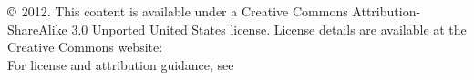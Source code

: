 \chapter*{}
\vfill


\noindent $\copyright$ 2012. This content is available under a Creative Commons Attribution-ShareAlike 3.0 Unported United States license. License details are available at the Creative Commons website:  \\

\noindent For license and attribution guidance, see 

